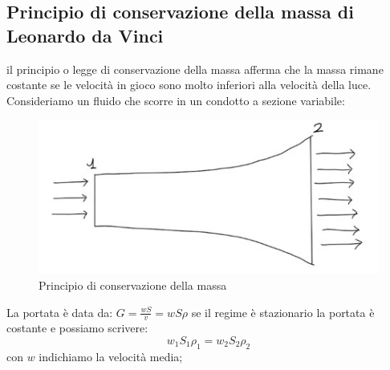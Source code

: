 \documentclass[a4paper]{article}
\numberwithin{equation}{section}%
\begin{document}
\subsection{Principio di conservazione della massa di Leonardo da Vinci}
il principio o legge di conservazione della massa afferma che la massa rimane costante se le velocità in gioco sono molto inferiori alla velocità della luce.
Consideriamo un fluido che scorre in un condotto a sezione variabile:
\begin{figure}[H]
	\begin{center}
		\includegraphics[width=0.4\columnwidth]{condottoasezionevariabile.jpg}
	\end{center}
	\caption{Principio di conservazione della massa}
\end{figure}
La portata è data da: $G=\frac{w S}{v}=w S \rho$
se il regime è stazionario la portata è costante e possiamo scrivere:
\begin{equation}
	w_{1} S_{1} \rho_{1}=w_{2} S_{2} \rho_{2}
\end{equation}
con $w$ indichiamo la velocità media; 
\end{document}
